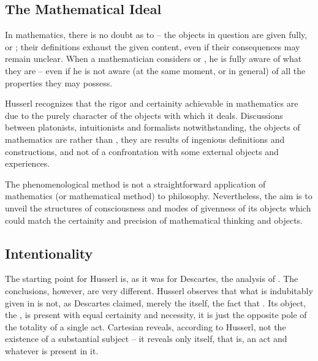 \subsection{The Mathematical Ideal}

In mathematics, there is no doubt as 
to  -- the objects in question are 
given 
fully, or ; their definitions exhaust the given 
content, even if their consequences may remain unclear. When a
mathematician considers  or , he is 
fully aware of 
what they are -- even if he is not aware (at the same moment, or in 
general) of all the properties they may possess. 

Husserl recognizes that the rigor and certainity
achievable in mathematics are due to the purely  
character of 
the objects with which it deals. Discussions between platonists, 
intuitionists and formalists 
notwithstanding, the objects of mathematics are  
rather than , they are results of ingenious 
definitions 
and constructions, and not of a confrontation with some external 
objects and experiences.

The phenomenological method is not a straightforward application of
mathematics (or mathematical method) to philosophy. 
Nevertheless, the aim is to unveil the structures of consciousness
and modes of givenness of its objects which could match
the certainity and precision of mathematical thinking and objects.
 
\subsection{Intentionality}
The starting point for Husserl is, as it was for Descartes, the 
analysis of . The conclusions, however, are very different.
Husserl observes that what is indubitably given in 
is not, as Descartes claimed, 
merely the  itself, the fact that . 
Its object, the , is 
present with equal certainity and necessity, it is just the opposite 
pole of the totality of a 
single act. Cartesian  reveals, according to Husserl, not 
the existence of a substantial subject -- it reveals only itself, 
that is, an act and whatever is present in it.

